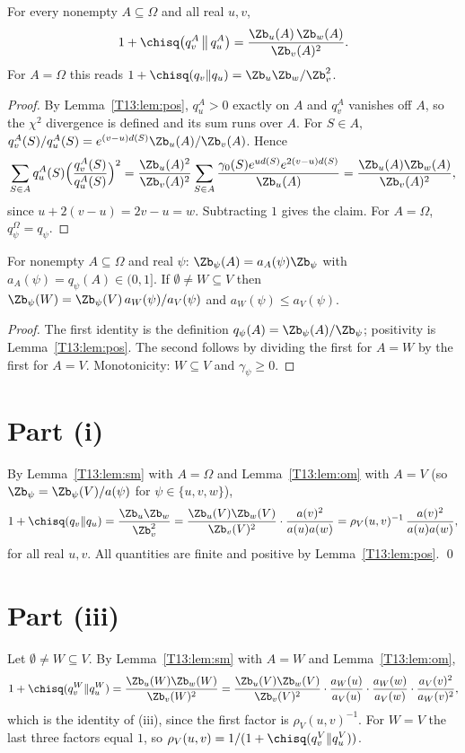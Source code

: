 \documentclass[11pt]{report}
\begin{document}
\begin{T13lemma}\label{T13:lem:sm}
For every nonempty $A\subseteq\Omega$ and all real $u,v$,
\[
1+\chisq\bigl(q_v^A\,\big\|\,q_u^A\bigr)=\frac{\Zb_u(A)\,\Zb_w(A)}{\Zb_v(A)^2}.
\]
For $A=\Omega$ this reads $1+\chisq(q_v\|q_u)=\Zb_u\Zb_w/\Zb_v^2$.
\end{T13lemma}
\begin{proof}
By Lemma~\ref{T13:lem:pos}, $q_u^A>0$ exactly on $A$ and $q_v^A$ vanishes off $A$, so the $\chi^2$ divergence is defined and its sum runs over $A$. For $S\in A$, $q_v^A(S)/q_u^A(S)=e^{(v-u)d(S)}\Zb_u(A)/\Zb_v(A)$. Hence
\[
\sum_{S\in A}q_u^A(S)\Bigl(\frac{q_v^A(S)}{q_u^A(S)}\Bigr)^2
=\frac{\Zb_u(A)^2}{\Zb_v(A)^2}\sum_{S\in A}\frac{\gamma_0(S)e^{ud(S)}e^{2(v-u)d(S)}}{\Zb_u(A)}
=\frac{\Zb_u(A)\Zb_w(A)}{\Zb_v(A)^2},
\]
since $u+2(v-u)=2v-u=w$. Subtracting $1$ gives the claim. For $A=\Omega$, $q^\Omega_\psi=q_\psi$.
\end{proof}

\begin{T13lemma}\label{T13:lem:om}
For nonempty $A\subseteq\Omega$ and real $\psi$: $\Zb_\psi(A)=a_A(\psi)\Zb_\psi$ with $a_A(\psi)=q_\psi(A)\in(0,1]$. If $\emptyset\neq W\subseteq V$ then $\Zb_\psi(W)=\Zb_\psi(V)\,a_W(\psi)/a_V(\psi)$ and $a_W(\psi)\le a_V(\psi)$.
\end{T13lemma}
\begin{proof}
The first identity is the definition $q_\psi(A)=\Zb_\psi(A)/\Zb_\psi$; positivity is Lemma~\ref{T13:lem:pos}. The second follows by dividing the first for $A=W$ by the first for $A=V$. Monotonicity: $W\subseteq V$ and $\gamma_\psi\ge0$.
\end{proof}

\section{Part (i)}
By Lemma~\ref{T13:lem:sm} with $A=\Omega$ and Lemma~\ref{T13:lem:om} with $A=V$ (so $\Zb_\psi=\Zb_\psi(V)/a(\psi)$ for $\psi\in\{u,v,w\}$),
\[
1+\chisq(q_v\|q_u)=\frac{\Zb_u\Zb_w}{\Zb_v^2}
=\frac{\Zb_u(V)\Zb_w(V)}{\Zb_v(V)^2}\cdot\frac{a(v)^2}{a(u)a(w)}
=\rho_V(u,v)^{-1}\,\frac{a(v)^2}{a(u)a(w)},
\]
for all real $u,v$. All quantities are finite and positive by Lemma~\ref{T13:lem:pos}. \qed

\section{Part (iii)}
Let $\emptyset\ne W\subseteq V$. By Lemma~\ref{T13:lem:sm} with $A=W$ and Lemma~\ref{T13:lem:om},
\[
1+\chisq(q_v^W\|q_u^W)=\frac{\Zb_u(W)\Zb_w(W)}{\Zb_v(W)^2}
=\frac{\Zb_u(V)\Zb_w(V)}{\Zb_v(V)^2}\cdot\frac{a_W(u)}{a_V(u)}\cdot\frac{a_W(w)}{a_V(w)}\cdot\frac{a_V(v)^2}{a_W(v)^2},
\]
which is the identity of (iii), since the first factor is $\rho_V(u,v)^{-1}$. For $W=V$ the last three factors equal $1$, so $\rho_V(u,v)=1/(1+\chisq(q_v^V\|q_u^V))$.
\end{document}
